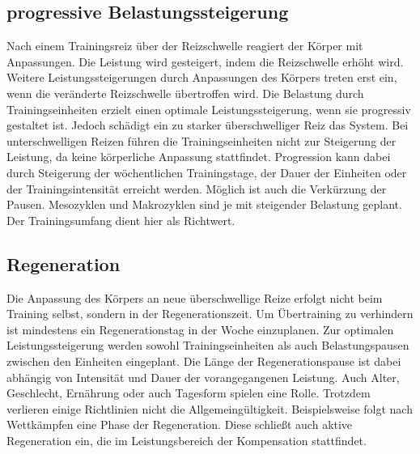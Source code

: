 \subsection{progressive Belastungssteigerung}
    Nach einem Trainingsreiz über der Reizschwelle reagiert der Körper mit Anpassungen. Die Leistung wird gesteigert, indem die Reizschwelle erhöht wird. Weitere Leistungssteigerungen durch Anpassungen des Körpers treten erst ein, wenn die veränderte Reizschwelle übertroffen wird. Die Belastung durch Trainingseinheiten erzielt einen optimale Leistungssteigerung, wenn sie progressiv gestaltet ist. Jedoch schädigt ein zu starker überschwelliger Reiz das System. Bei unterschwelligen Reizen führen die Trainingseinheiten nicht zur Steigerung der Leistung, da keine körperliche Anpassung stattfindet. \cite[58]{Seidenspinner2005} Progression kann dabei durch Steigerung der wöchentlichen Trainingstage, der Dauer der Einheiten oder der Trainingsintensität erreicht werden. Möglich ist auch die Verkürzung der Pausen.\newline 
    Mesozyklen und Makrozyklen sind je mit steigender Belastung geplant. Der Trainingsumfang dient hier als Richtwert. \cite[60-61]{Radsporttraining}
\subsection{Regeneration}
    Die Anpassung des Körpers an neue überschwellige Reize erfolgt nicht beim Training selbst, sondern in der Regenerationszeit. Um Übertraining zu verhindern ist mindestens ein Regenerationstag in der Woche einzuplanen. 
    Zur optimalen Leistungssteigerung werden sowohl Trainingseinheiten als auch Belastungspausen zwischen den Einheiten eingeplant. Die Länge der Regenerationspause ist dabei abhängig von Intensität und Dauer der vorangegangenen Leistung. Auch Alter, Geschlecht, Ernährung oder auch Tagesform spielen eine Rolle. Trotzdem verlieren einige Richtlinien nicht die Allgemeingültigkeit. Beispielsweise folgt nach Wettkämpfen eine Phase der Regeneration. Diese schließt auch aktive Regeneration ein, die im Leistungsbereich der Kompensation stattfindet.
